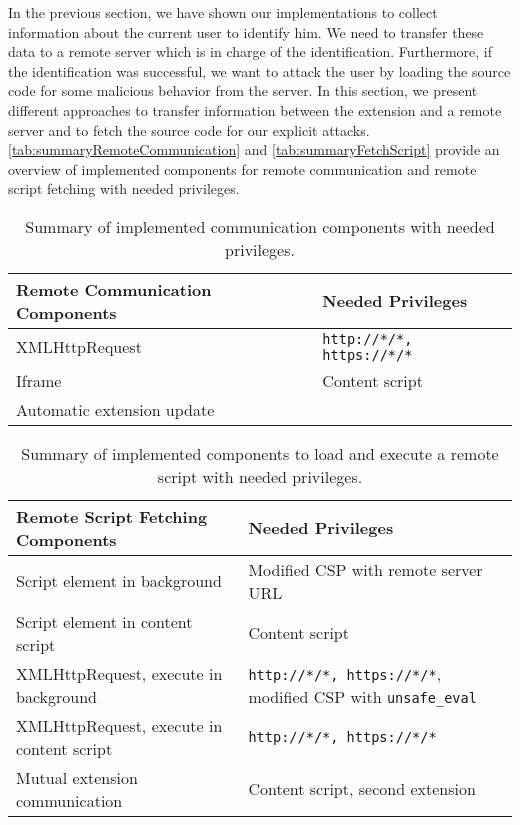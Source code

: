 	In the previous section, we have shown our implementations to collect information about the current user to identify him. We need to transfer these data to a remote server which is in charge of the identification. Furthermore, if the identification was successful, we want to attack the user by loading the source code for some malicious behavior from the server. In this section, we present different approaches to transfer information between the extension and a remote server and to fetch the source code for our explicit attacks. \autoref{tab:summaryRemoteCommunication} and \autoref{tab:summaryFetchScript} provide an overview of implemented components for remote communication and remote script fetching with needed privileges.
	
	\begin{table}[h]
		\centering
		\begin{tabular}{|l|l|} \hline
			\textbf{Remote Communication Components} & \textbf{Needed Privileges} \\ \hline
			XMLHttpRequest & \texttt{http://*/*, https://*/*}  \\
			Iframe & Content script \\
			Automatic extension update & \\ 
			\hline
		\end{tabular}
		\caption{Summary of implemented communication components with needed privileges.}
		\label{tab:summaryRemoteCommunication}
	\end{table}
	
	\begin{table}[h]
		\centering
		\begin{tabular}{|l|l|} \hline
			\textbf{Remote Script Fetching Components} & \textbf{Needed Privileges} \\ \hline
			Script element in background & Modified CSP with remote server URL \\
			Script element in content script & Content script \\
			XMLHttpRequest, execute in background & \texttt{http://*/*, https://*/*}, modified CSP with \texttt{unsafe\_eval} \\
			XMLHttpRequest, execute in content script & \texttt{http://*/*, https://*/*}  \\
			Mutual extension communication & Content script, second extension \\ 
			\hline
		\end{tabular}
		\caption{Summary of implemented components to load and execute a remote script with needed privileges.}
		\label{tab:summaryFetchScript}
	\end{table}
	
